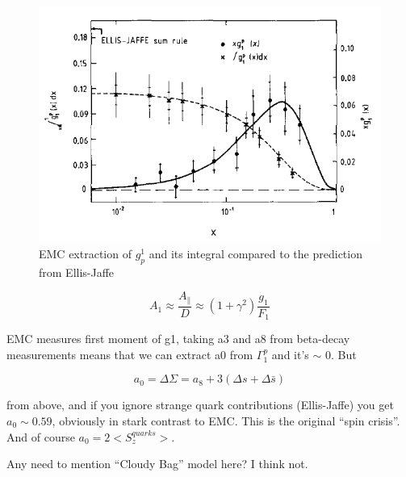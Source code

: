 \begin{figure}
  \includegraphics[width=1.0\textwidth]{figures/emc-g1p}
  \caption{EMC extraction of $g^1_p$ and its integral compared to the prediction from Ellis-Jaffe \cite{Ashman:1987hv}}
  \label{fig:emc-g1p}
\end{figure}

\begin{equation}
  A_1 \approx \frac{A_{\parallel}}{D} \approx (1 + \gamma^2)\frac{g_1}{F_1}
\end{equation}

EMC measures first moment of g1, taking a3 and a8 from beta-decay measurements means that we can extract a0 from $\Gamma_1^p$ and it's $\sim$ 0.  But

\begin{equation}
  a_0 = \Delta \Sigma = a_8 + 3(\Delta s + \Delta \bar{s})
\end{equation}

from above, and if you ignore strange quark contributions (Ellis-Jaffe) you get $a_0 \sim 0.59$, obviously in stark contrast to EMC.  This is the original ``spin crisis''.  And of course $a_0 = 2<S_z^{quarks}>$.

Any need to mention ``Cloudy Bag'' model here?  I think not.

